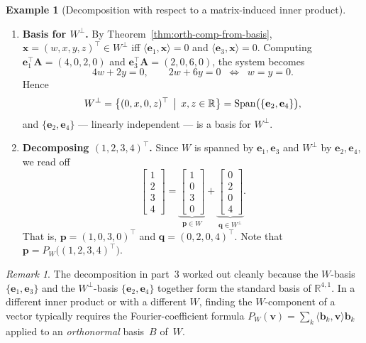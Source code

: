 \documentclass[11pt, a4paper, notitlepage]{report}
\theoremstyle{definition}
\newtheorem{example}[theorem]{Example}
\theoremstyle{remark}
\newtheorem{remark}[theorem]{Remark}
\begin{document}
\begin{example}[Decomposition with respect to a matrix-induced inner product]
\begin{enumerate}
  \item \textbf{Basis for $W^\perp$.} By Theorem~\ref{thm:orth-comp-from-basis},
        $\mathbf{x} = (w,x,y,z)^\top\in W^\perp$ iff
        $\langle\mathbf{e}_1,\mathbf{x}\rangle = 0$ and $\langle\mathbf{e}_3,\mathbf{x}\rangle = 0$.
        Computing $\mathbf{e}_1^\top\mathbf{A} = (4,0,2,0)$ and $\mathbf{e}_3^\top\mathbf{A} = (2,0,6,0)$,
        the system becomes
        \[
          4w + 2y = 0,
          \qquad 2w + 6y = 0
          \;\;\Longleftrightarrow\;\; w = y = 0.
        \]
        Hence
        \[
          W^\perp = \bigl\{(0,x,0,z)^\top \,\bigm|\, x,z\in\mathbb{R}\bigr\}
                  = \mathrm{Span}\bigl(\{\mathbf{e}_2,\mathbf{e}_4\}\bigr),
        \]
        and $\{\mathbf{e}_2,\mathbf{e}_4\}$ --- linearly independent --- is a basis for $W^\perp$.

  \item \textbf{Decomposing $(1,2,3,4)^\top$.} Since $W$ is spanned by
        $\mathbf{e}_1,\mathbf{e}_3$ and $W^\perp$ by $\mathbf{e}_2,\mathbf{e}_4$, we read off
        \[
          \begin{bmatrix}1\\2\\3\\4\end{bmatrix}
          = \underbrace{\begin{bmatrix}1\\0\\3\\0\end{bmatrix}}_{\mathbf{p}\in W}
          + \underbrace{\begin{bmatrix}0\\2\\0\\4\end{bmatrix}}_{\mathbf{q}\in W^\perp}.
        \]
        That is, $\mathbf{p} = (1,0,3,0)^\top$ and $\mathbf{q} = (0,2,0,4)^\top$. Note
        that $\mathbf{p} = P_W\bigl((1,2,3,4)^\top\bigr)$.
\end{enumerate}
\end{example}

\begin{remark}
The decomposition in part~3 worked out cleanly because the $W$-basis
$\{\mathbf{e}_1,\mathbf{e}_3\}$ and the $W^\perp$-basis $\{\mathbf{e}_2,\mathbf{e}_4\}$
together form the standard basis of $\mathbb{R}^{4,1}$. In a different
inner product or with a different $W$, finding the $W$-component of a vector
typically requires the Fourier-coefficient formula
$P_W(\mathbf{v}) = \sum_k\langle\mathbf{b}_k,\mathbf{v}\rangle\mathbf{b}_k$
applied to an \emph{orthonormal} basis~$B$ of~$W$.
\end{remark}
\end{document}
